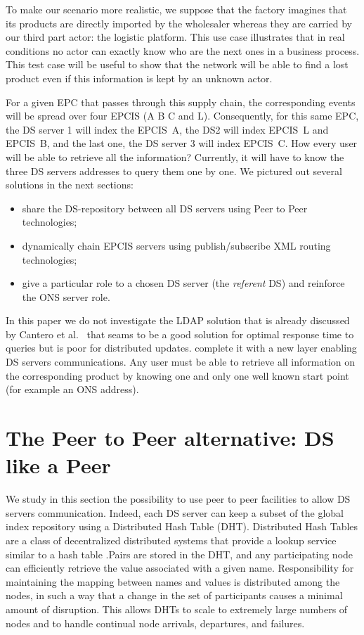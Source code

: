 \documentclass[a4paper]{llncs}
\begin{document}
To make our scenario more realistic, we suppose that the factory imagines that its products are
directly imported by the wholesaler whereas they are carried by our third part actor: the logistic
platform. This use case illustrates that in real conditions no actor can exactly know who are the
next ones in a business process. This test case will be useful to show that the network will be able
to find a lost product even if this information is kept by an unknown actor.

For a given EPC that passes through this supply chain, the corresponding events will be spread over
four EPCIS (A B C and L). Consequently, for this same EPC, the DS server 1 will index the EPCIS~A,
the DS2 will index EPCIS~L and EPCIS~B, and the last one, the DS server 3 will index EPCIS~C. How
every user will be able to retrieve all the information? Currently, it will have to know the three
DS servers addresses to query them one by one. We pictured out several solutions in the next
sections:

\begin{itemize}
\item share the DS-repository between all DS servers using Peer to Peer technologies;
\item dynamically chain EPCIS servers using publish/subscribe XML routing technologies;
\item give a particular role to a chosen DS server (the \emph{referent} DS) and reinforce the ONS server role.
\end{itemize}

In this paper we do not investigate the LDAP solution that is already discussed by Cantero et
al.~\cite{tracabilityDS} that seams to be a good solution for optimal response time to queries but
is poor for distributed updates.
complete it with a new layer enabling DS servers communications. Any user must be able to retrieve
all information on the corresponding product by knowing one and only one well known start point (for
example an ONS address). 


\section{The Peer to Peer alternative: DS like a Peer}

We study in this section the possibility to use peer to peer facilities to allow DS servers
communication. Indeed, each DS server can keep a subset of the global index repository using a
Distributed Hash Table (DHT). Distributed Hash Tables are a class of decentralized distributed
systems that provide a lookup service similar to a hash table .Pairs are stored in the DHT, and any
participating node can efficiently retrieve the value associated with a given name. Responsibility
for maintaining the mapping between names and values is distributed among the nodes, in such a way
that a change in the set of participants causes a minimal amount of disruption. This allows DHTs to
scale to extremely large numbers of nodes and to handle continual node arrivals, departures, and
failures.
\end{document}
